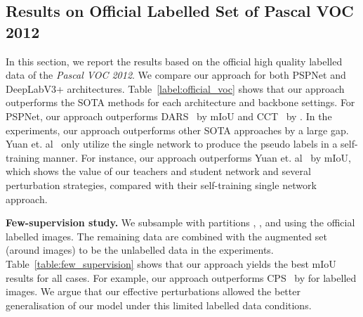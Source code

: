 \documentclass[10pt,twocolumn,letterpaper]{article}
\begin{document}
\subsection{Results on Official Labelled Set of Pascal VOC 2012}
\label{sec:4.3}
In this section, we report the results based on the official  high quality labelled data of the \textit{Pascal VOC 2012}. 
We compare our approach for both PSPNet and DeepLabV3+ architectures. 
Table~\ref{label:official_voc} shows that our approach outperforms the SOTA methods for each architecture and backbone settings. For PSPNet, our approach outperforms DARS~\cite{he2021re} by  mIoU and CCT~\cite{ouali2020semi} by . In the  experiments, our approach outperforms other SOTA approaches by a large gap. Yuan et. al~\cite{yuan2021simple} only utilize the single network to produce the pseudo labels in a self-training manner. For instance, our approach outperforms Yuan et. al~\cite{yuan2021simple} by  mIoU, which shows the value of our teachers and student network and several perturbation strategies, compared with their self-training single network approach. 

\textbf{Few-supervision study.} We subsample with partitions , ,  and  using the official  labelled images. The remaining data are combined with the augmented set~\cite{hariharan2011semantic} (around  images) to be the unlabelled data in the experiments. 
Table~\ref{table:few_supervision} shows that our approach yields the best mIoU results for all cases. For example, our approach outperforms CPS~\cite{chen2021semi} by  for  labelled images. 
We argue that our effective perturbations allowed the better generalisation of our model under this limited labelled data conditions.
\end{document}
